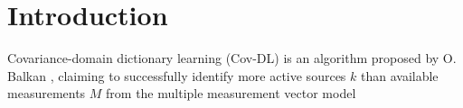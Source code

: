 \section{Introduction}
Covariance-domain dictionary learning (Cov-DL) is an algorithm proposed by O. Balkan \cite{Balkan2015}, claiming to successfully identify more active sources $k$ than available measurements $M$ from the multiple measurement vector model 

